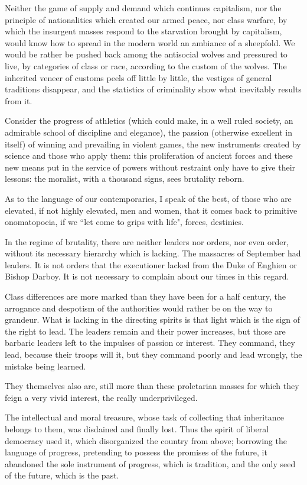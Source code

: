 Neither the game of supply and demand which continues capitalism, nor the principle of nationalities which created our armed peace, nor class warfare, by which the insurgent masses respond to the starvation brought by capitalism, would know how to spread in the modern world an ambiance of a sheepfold. We would be rather be pushed back among the antisocial wolves and pressured to live, by categories of class or race, according to the custom of the wolves. The inherited veneer of customs peels off little by little, the vestiges of general traditions disappear, and the statistics of criminality show what inevitably results from it.

Consider the progress of athletics (which could make, in a well ruled society, an admirable school of discipline and elegance), the passion (otherwise excellent in itself) of winning and prevailing in violent games, the new instruments created by science and those who apply them: this proliferation of ancient forces and these new means put in the service of powers without restraint only have to give their lessons: the moralist, with a thousand signs, sees brutality reborn.

As to the language of our contemporaries, I speak of the best, of those who are elevated, if not highly elevated, men and women, that it comes back to primitive onomatopoeia, if we ``let come to grips with life", forces, destinies.

In the regime of brutality, there are neither leaders nor orders, nor even order, without its necessary hierarchy which is lacking. The massacres of September had leaders. It is not orders that the executioner lacked from the Duke of Enghien or Bishop Darboy. It is not necessary to complain about our times in this regard.

Class differences are more marked than they have been for a half century, the arrogance and despotism of the authorities would rather be on the way to grandeur. What is lacking in the directing spirits is that light which is the sign of the right to lead. The leaders remain and their power increases, but those are barbaric leaders left to the impulses of passion or interest. They command, they lead, because their troops will it, but they command poorly and lead wrongly, the mistake being learned.

They themselves also are, still more than these proletarian masses for which they feign a very vivid interest, the really underprivileged.

The intellectual and moral treasure, whose task of collecting that inheritance belongs to them, was disdained and finally lost. Thus the spirit of liberal democracy used it, which disorganized the country from above; borrowing the language of progress, pretending to possess the promises of the future, it abandoned the sole instrument of progress, which is tradition, and the only seed of the future, which is the past.

